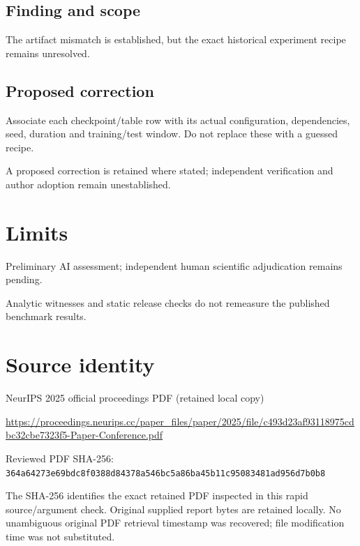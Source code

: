 \documentclass[11pt]{article}
\begin{document}
\subsection*{Finding and scope}

The artifact mismatch is established, but the exact historical experiment recipe remains unresolved.

\subsection*{Proposed correction}

Associate each checkpoint/table row with its actual configuration, dependencies, seed, duration and training/test window. Do not replace these with a guessed recipe.

A proposed correction is retained where stated; independent verification and author adoption remain unestablished.

\section*{Limits}

Preliminary AI assessment; independent human scientific adjudication remains pending.\par

Analytic witnesses and static release checks do not remeasure the published benchmark results.\par

\section*{Source identity}

NeurIPS 2025 official proceedings PDF (retained local copy)

\url{https://proceedings.neurips.cc/paper_files/paper/2025/file/c493d23af93118975cdbc32cbe7323f5-Paper-Conference.pdf}

Reviewed PDF SHA-256: \nolinkurl{364a64273e69bdc8f0388d84378a546bc5a86ba45b11c95083481ad956d7b0b8}

The SHA-256 identifies the exact retained PDF inspected in this rapid source/argument check. Original supplied report bytes are retained locally. No unambiguous original PDF retrieval timestamp was recovered; file modification time was not substituted.
\end{document}
